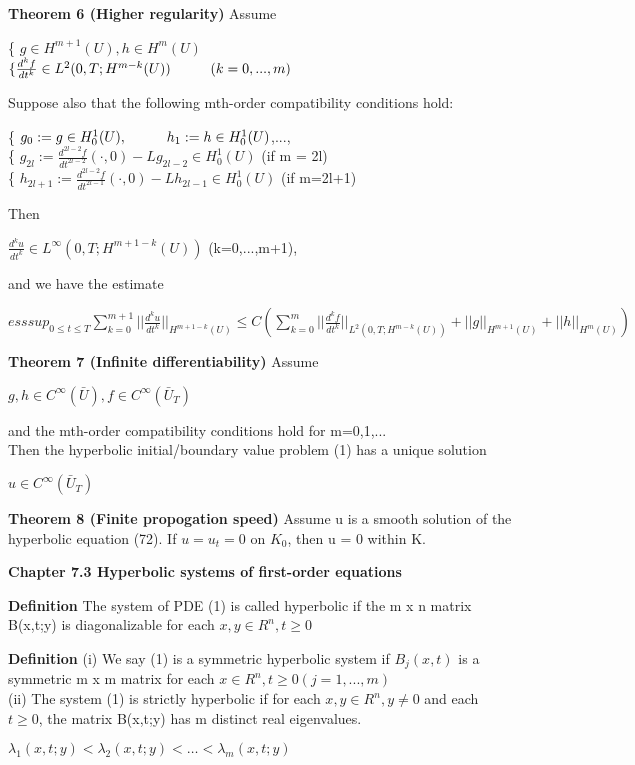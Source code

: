 \documentclass{article}
\newcommand\tab[1][1cm]{\hspace*{#1}}
\begin{document}
\textbf {Theorem 6 (Higher regularity)} Assume
\begin{center}
\{ $g \in H^{m+1}(U), h \in H^m(U)$ \\
$\{ \frac{d^{k}f}{dt^{k}} \in L^2 (0, T; H^{m-k}(U)) \tab (k = 0,...,m)$
\end{center}
Suppose also that the following mth-order compatibility conditions hold:
\begin{center}
\{ $g_0 := g \in H_{0}^{1}(U), \tab h_1 := h \in H_{0}^{1}(U)$,..., \\
\{ $g_{2l} := \frac{d^{2l-2}f}{dt^{2l-2}}(\cdot, 0) - Lg_{2l-2} \in H_{0}^{1}(U)$ \tab (if m = 2l) \\
\{ $h_{2l+1} := \frac{d^{2l-2}f}{dt^{2l-1}}(\cdot, 0)- Lh_{2l-1} \in H_{0}^{1} (U)$ \tab (if m=2l+1)
\end{center}
Then
\begin{center}
$\frac{d^{k}u}{dt^{k}} \in L^{\infty}(0, T; H^{m+1-k}(U))$ \tab (k=0,...,m+1),
\end{center}
and we have the estimate
\begin{center}
$ess sup_{0 \leq t \leq T} \sum_{k=0}^{m+1} ||\frac{d^{k}u}{dt^{k}}||_{H^{m+1-k}(U)} \leq C(\sum_{k=0}^m ||\frac{d^{k}f}{dt^{k}}||_{L^{2}(0, T; H^{m-k}(U))} + ||g||_{H^{m+1}(U)} + ||h||_{H^{m}(U)})$
\end{center}

\textbf {Theorem 7 (Infinite differentiability)} Assume 
\begin{center}
$g, h \in C^{\infty}(\bar{U}), f \in C^{\infty}(\bar{U}_T)$
\end{center}
and the mth-order compatibility conditions hold for m=0,1,... \\
\tab Then the hyperbolic initial/boundary value problem (1) has a unique solution
\begin{center}
$u \in C^{\infty}(\bar{U}_T)$
\end{center}

\textbf {Theorem 8 (Finite propogation speed)} Assume u is a smooth solution of the hyperbolic equation (72). If $u = u_t = 0$ on $K_0$, then u = 0 within K.

\textbf {Chapter 7.3 Hyperbolic systems of first-order equations}

\textbf {Definition} The system of PDE (1) is called hyperbolic if the m x n matrix B(x,t;y) is diagonalizable for each $x, y \in R^n, t \geq 0$

\textbf {Definition} (i) We say (1) is a symmetric hyperbolic system if $B_j(x,t)$ is a symmetric m x m matrix for each $x \in R^n, t \geq 0 (j=1,...,m)$ \\
\tab (ii) The system (1) is strictly hyperbolic if for each $x, y \in R^n, y \neq 0$ and each $t \geq 0$, the matrix B(x,t;y) has m distinct real eigenvalues.
\begin{center}
$\lambda_1(x,t;y) < \lambda_2(x,t;y) < \dots < \lambda_m(x,t;y)$
\end{center}
\end{document}
